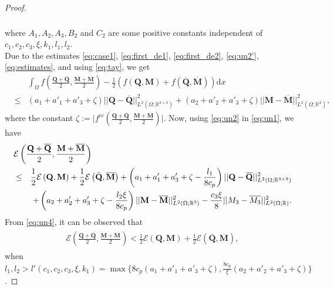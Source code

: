 \documentclass{article}
\def\Qvec{\mathbf{Q}}
\def \Mvec{\mathbf{M}}
\def\d{\mathrm{d}}
\begin{document}
\begin{proof}
\begin{eqnarray}
\begin{aligned}
\end{aligned}\label{eq:estimates}
\end{eqnarray}
where $A_1, A_2, A_3, B_2$ and $C_2$ are some positive constants independent of $c_1, c_2, c_3, \xi, k_1, l_1, l_2$.\newline\\
Due to the estimates \eqref{eq:case1}, \eqref{eq:first_de1}, \eqref{eq:first_de2}, \eqref{eq:un2'}, \eqref{eq:estimates}, and using \eqref{eq:tay}, we get
\begin{eqnarray}\label{eq:un2}
& &\int_{\Omega}f\left(\frac{\Qvec+\overline{\Qvec}}{2}, \frac{\Mvec+\overline{\Mvec}}{2}\right)-\frac{1}{2}\left(f\left(\Qvec, \Mvec\right) + f\left(\overline{\Qvec}, \overline{\Mvec}\right)\right)\d x\nonumber\\
&\le& \left(a_1+a'_1+a'_3+\zeta\right)||\Qvec-\overline{\Qvec}||^2_{L^2\left(\Omega; \mathbb R^{3\times 3}\right)} + \left(a_2+a'_2+a'_3+\zeta\right)||\Mvec-\overline{\Mvec}||^2_{L^2\left(\Omega;\mathbb R^3\right)},
\end{eqnarray}
where the constant $\zeta := \bigg|f^{iv}\left(\frac{\Qvec+\overline{\Qvec}}{2}, \frac{\Mvec+\overline{\Mvec}}{2}\right)\bigg|$. 
Now, using \eqref{eq:un2} in \eqref{eq:un1}, we have
\begin{eqnarray}\label{eq:un4}
\lefteqn{\mathcal{E}\left(\frac{\Qvec+\overline{\Qvec}}{2}, \frac{\Mvec+\overline{\Mvec}}{2}\right)}\nonumber\\
&\le&\frac{1}{2}\mathcal{E}\left(\Qvec, \Mvec\right) + \frac{1}{2}\mathcal{E}\left(\bar{\Qvec}, \overline{\Mvec}\right)+\left(a_1+a'_1+a'_3+\zeta-\frac{l_1}{8c_p}\right)||\Qvec-\overline{\Qvec}||^2_{L^2\left(\Omega; \mathbb R^{3\times 3}\right)}\nonumber\\
&&+ \left(a_2+a'_2+a'_3+\zeta-\frac{l_2\xi}{8c_p}\right)||\Mvec-\overline{\Mvec}||^2_{L^2\left(\Omega; \mathbb R^3\right)} - \frac{c_3\xi}{8}||M_3-\overline{M_3}||^2_{L^2\left(\Omega; \mathbb R\right)}.
\end{eqnarray}
From \eqref{eq:un4}, it can be observed that
\begin{eqnarray}\label{eq:un5}
\begin{aligned}
\mathcal{E}\left(\frac{\Qvec+\overline{\Qvec}}{2}, \frac{\Mvec+\overline{\Mvec}}{2}\right)<\frac{1}{2}\mathcal{E}\left(\Qvec, \Mvec\right) + \frac{1}{2}\mathcal{E}\left(\overline{\Qvec}, \overline{\Mvec}\right),
\end{aligned}
\end{eqnarray}
when $l_1, l_2>l'\left(c_1, c_2, c_3, \xi, k_1\right)=\max \Big\{8c_p\left(a_1+a'_1+a'_3+\zeta\right), \frac{8c_p}{\xi}\left(a_2+a'_2+a'_3+\zeta\right)\Big\}$.\newline

\end{proof}
\end{document}
